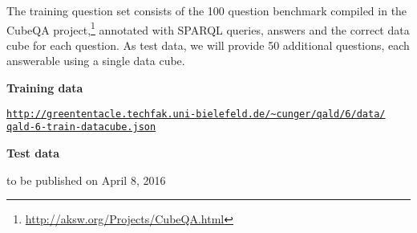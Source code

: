 The training question set consists of the 100 question benchmark compiled in the CubeQA project,\footnote{\url{http://aksw.org/Projects/CubeQA.html}} annotated with SPARQL queries, answers and the correct data cube for each question. As test data, we will provide 50 additional questions, each answerable using a single data cube.

\textbf{Training data}

\href{http://greententacle.techfak.uni-bielefeld.de/~cunger/qald/6/data/qald-6-train-datacube.json}{\texttt{http://greententacle.techfak.uni-bielefeld.de/\textasciitilde cunger/qald/6/data/\\qald-6-train-datacube.json}}

\textbf{Test data}

to be published on April 8, 2016

